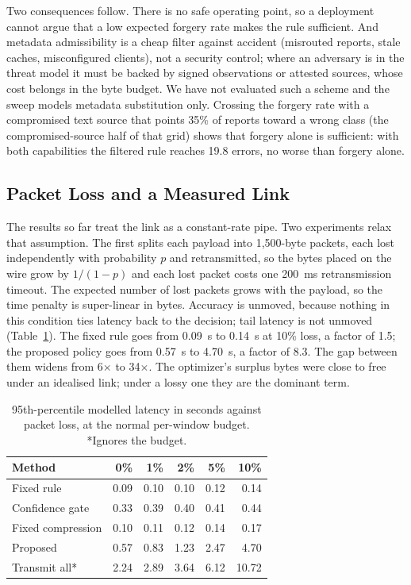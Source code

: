 \documentclass[conference,a4paper]{IEEEtran}
\newif\ifsubmission
\newcommand{\masteronly}[1]{\ifsubmission\else#1\fi}
\newcommand{\mtab}[2]{\ifsubmission#2\else Table~\ref{#1}\fi}
\begin{document}
Two consequences follow. There is no safe operating point, so a deployment cannot argue that a low expected forgery rate makes the rule sufficient. And metadata admissibility is a cheap filter against accident (misrouted reports, stale caches, misconfigured clients), not a security control; where an adversary is in the threat model it must be backed by signed observations or attested sources, whose cost belongs in the byte budget. We have not evaluated such a scheme and the sweep models metadata substitution only. Crossing the forgery rate with a compromised text source that points 35\% of reports toward a wrong class (the compromised-source half of that grid) shows that forgery alone is sufficient: with both capabilities the filtered rule reaches 19.8 errors, no worse than forgery alone.

\subsection{Packet Loss and a Measured Link}
\label{sec:link}
The results so far treat the link as a constant-rate pipe. Two experiments relax that assumption. The first splits each payload into 1,500-byte packets, each lost independently with probability $p$ and retransmitted, so the bytes placed on the wire grow by $1/(1-p)$ and each lost packet costs one 200~ms retransmission timeout. The expected number of lost packets grows with the payload, so the time penalty is super-linear in bytes. Accuracy is unmoved, because nothing in this condition ties latency back to the decision; tail latency is not unmoved (\mtab{tab:loss}{full grid in the package}). The fixed rule goes from 0.09~s to 0.14~s at 10\% loss, a factor of 1.5; the proposed policy goes from 0.57~s to 4.70~s, a factor of 8.3. The gap between them widens from 6$\times$ to 34$\times$. The optimizer's surplus bytes were close to free under an idealised link; under a lossy one they are the dominant term.

\masteronly{%
\begin{table}[t]
\caption{95th-percentile modelled latency in seconds against packet loss, at the normal per-window budget. *Ignores the budget.}
\label{tab:loss}
\centering\footnotesize
\begin{tabular}{@{}lrrrrr@{}}
\toprule
Method & 0\% & 1\% & 2\% & 5\% & 10\% \\
\midrule
Fixed rule & 0.09 & 0.10 & 0.10 & 0.12 & 0.14 \\
Confidence gate & 0.33 & 0.39 & 0.40 & 0.41 & 0.44 \\
Fixed compression & 0.10 & 0.11 & 0.12 & 0.14 & 0.17 \\
Proposed & 0.57 & 0.83 & 1.23 & 2.47 & 4.70 \\
Transmit all* & 2.24 & 2.89 & 3.64 & 6.12 & 10.72 \\
\bottomrule
\end{tabular}
\end{table}}%
\end{document}
